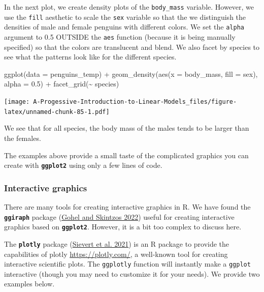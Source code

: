 \documentclass[
]{book}
\newenvironment{Shaded}{\begin{snugshade}}{\end{snugshade}}
\newcommand{\AttributeTok}[1]{\textcolor[rgb]{0.77,0.63,0.00}{#1}}
\newcommand{\FloatTok}[1]{\textcolor[rgb]{0.00,0.00,0.81}{#1}}
\newcommand{\FunctionTok}[1]{\textcolor[rgb]{0.00,0.00,0.00}{#1}}
\newcommand{\NormalTok}[1]{#1}
\newcommand{\SpecialCharTok}[1]{\textcolor[rgb]{0.00,0.00,0.00}{#1}}
\theoremstyle{definition}
\theoremstyle{definition}
\theoremstyle{definition}
\theoremstyle{definition}
\theoremstyle{remark}
\begin{document}
In the next plot, we create density plots of the \texttt{body\_mass} variable. However, we use the \texttt{fill} aesthetic to scale the \texttt{sex} variable so that the we distinguish the densities of male and female penguins with different colors. We set the \texttt{alpha} argument to 0.5 OUTSIDE the \texttt{aes} function (because it is being manually specified) so that the colors are translucent and blend. We also facet by species to see what the patterns look like for the different species.

\begin{Shaded}
\begin{Highlighting}[]
\FunctionTok{ggplot}\NormalTok{(}\AttributeTok{data =}\NormalTok{ penguins\_temp) }\SpecialCharTok{+}
  \FunctionTok{geom\_density}\NormalTok{(}\FunctionTok{aes}\NormalTok{(}\AttributeTok{x =}\NormalTok{ body\_mass, }\AttributeTok{fill =}\NormalTok{ sex), }\AttributeTok{alpha =} \FloatTok{0.5}\NormalTok{) }\SpecialCharTok{+}
  \FunctionTok{facet\_grid}\NormalTok{(}\SpecialCharTok{\textasciitilde{}}\NormalTok{ species)}
\end{Highlighting}
\end{Shaded}

\texttt{[image: A-Progessive-Introduction-to-Linear-Models\_files/figure-latex/unnamed-chunk-85-1.pdf]}

We see that for all species, the body mass of the males tends to be larger than the females.

The examples above provide a small taste of the complicated graphics you can create with \textbf{\texttt{ggplot2}} using only a few lines of code.

\hypertarget{interactive-graphics}{%
\subsubsection{Interactive graphics}\label{interactive-graphics}}

There are many tools for creating interactive graphics in R. We have found the \textbf{\texttt{ggiraph}} package (\protect\hyperlink{ref-R-ggiraph}{Gohel and Skintzos 2022}) useful for creating interactive graphics based on \textbf{\texttt{ggplot2}}. However, it is a bit too complex to discuss here.

The \textbf{\texttt{plotly}} package (\protect\hyperlink{ref-R-plotly}{Sievert et al. 2021}) is an R package to provide the capabilities of plotly \url{https://plotly.com/}, a well-known tool for creating interactive scientific plots. The \texttt{ggplotly} function will instantly make a \texttt{ggplot} interactive (though you may need to customize it for your needs). We provide two examples below.
\end{document}
